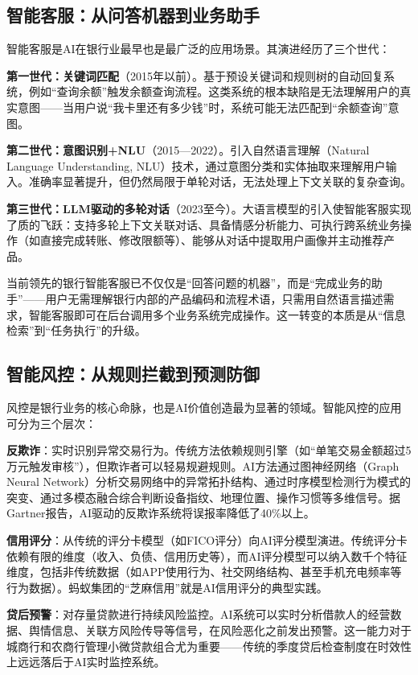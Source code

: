 \subsection{智能客服：从问答机器到业务助手}

智能客服是AI在银行业最早也是最广泛的应用场景。其演进经历了三个世代：

\textbf{第一世代：关键词匹配}（2015年以前）。基于预设关键词和规则树的自动回复系统，例如``查询余额''触发余额查询流程。这类系统的根本缺陷是无法理解用户的真实意图——当用户说``我卡里还有多少钱''时，系统可能无法匹配到``余额查询''意图。

\textbf{第二世代：意图识别+NLU}（2015—2022）。引入自然语言理解（Natural Language Understanding, NLU）技术，通过意图分类和实体抽取来理解用户输入。准确率显著提升，但仍然局限于单轮对话，无法处理上下文关联的复杂查询。

\textbf{第三世代：LLM驱动的多轮对话}（2023至今）。大语言模型的引入使智能客服实现了质的飞跃：支持多轮上下文关联对话、具备情感分析能力、可执行跨系统业务操作（如直接完成转账、修改限额等）、能够从对话中提取用户画像并主动推荐产品。

当前领先的银行智能客服已不仅仅是``回答问题的机器''，而是``完成业务的助手''——用户无需理解银行内部的产品编码和流程术语，只需用自然语言描述需求，智能客服即可在后台调用多个业务系统完成操作。这一转变的本质是从``信息检索''到``任务执行''的升级。

\subsection{智能风控：从规则拦截到预测防御}

风控是银行业务的核心命脉，也是AI价值创造最为显著的领域。智能风控的应用可分为三个层次：

\textbf{反欺诈}：实时识别异常交易行为。传统方法依赖规则引擎（如``单笔交易金额超过5万元触发审核''），但欺诈者可以轻易规避规则。AI方法通过图神经网络（Graph Neural Network）分析交易网络中的异常拓扑结构、通过时序模型检测行为模式的突变、通过多模态融合综合判断设备指纹、地理位置、操作习惯等多维信号。据Gartner报告，AI驱动的反欺诈系统将误报率降低了40\%以上\parencite{gartner2024banking}。

\textbf{信用评分}：从传统的评分卡模型（如FICO评分）向AI评分模型演进。传统评分卡依赖有限的维度（收入、负债、信用历史等），而AI评分模型可以纳入数千个特征维度，包括非传统数据（如APP使用行为、社交网络结构、甚至手机充电频率等行为数据）。蚂蚁集团的``芝麻信用''就是AI信用评分的典型实践。

\textbf{贷后预警}：对存量贷款进行持续风险监控。AI系统可以实时分析借款人的经营数据、舆情信息、关联方风险传导等信号，在风险恶化之前发出预警。这一能力对于城商行和农商行管理小微贷款组合尤为重要——传统的季度贷后检查制度在时效性上远远落后于AI实时监控系统。

